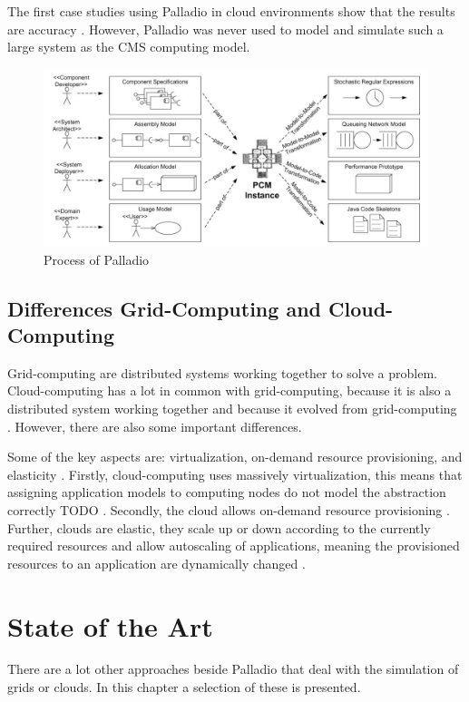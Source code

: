 The first case studies using Palladio in cloud environments show that the results are accuracy \cite{arch}. However, Palladio was never used to model and simulate such a large system as the CMS computing model.

\begin{figure}
	\centering
	\includegraphics[width=0.9\linewidth]{images/palladio}
	\caption[]{Process of Palladio \cite{BECKER20093}}
	\label{fig:palladio}
\end{figure}



\section{Differences Grid-Computing and Cloud-Computing}
Grid-computing are distributed systems working together to solve a problem. Cloud-computing has a lot in common with grid-computing, because it is also a distributed system working together and because it evolved from grid-computing \cite{foster2008cloud}.
However, there are also some important differences.

Some of the key aspects are: virtualization, on-demand resource provisioning, and elasticity \cite{foster2008cloud}.
Firstly, cloud-computing uses massively virtualization, this means that assigning application models to computing nodes do not model the abstraction correctly TODO \cite{cloud_sim}. Secondly, the cloud allows on-demand resource provisioning \cite{foster2008cloud}. Further, clouds are elastic, they scale up or down according to the currently required resources and allow autoscaling of applications, meaning the provisioned resources to an application are dynamically changed \cite{cloud_sim}.

\chapter{State of the Art}
\label{state}
There are a lot other approaches beside Palladio that deal with the simulation of grids or clouds.
In this chapter a selection of these is presented.



